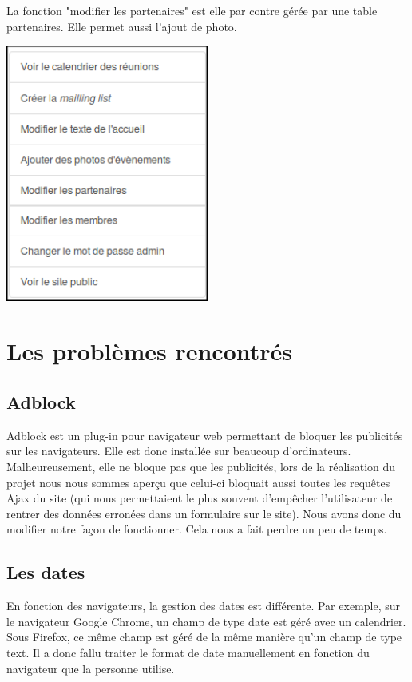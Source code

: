 \documentclass[11pt,a4paper,titlepage]{report}
\begin{document}
La fonction "modifier les partenaires" est elle par contre gérée par une table partenaires. 
Elle permet aussi l'ajout de photo.


\begin{center}
\includegraphics[width=0.5\textwidth]{gestion.png}~
\end{center}

\chapter{Les problèmes rencontrés}

\section{Adblock} 
Adblock est un plug-in pour navigateur web permettant de bloquer les publicités sur les navigateurs. Elle est donc installée sur beaucoup d'ordinateurs. 
Malheureusement, elle ne bloque pas que les publicités, lors de la réalisation du projet nous nous sommes aperçu que celui-ci bloquait aussi toutes les requêtes Ajax du site (qui nous permettaient le plus souvent d’empêcher l'utilisateur de rentrer des données erronées dans un formulaire sur le site).
Nous avons donc du modifier notre façon de fonctionner. Cela nous a fait perdre un peu de temps.

\section{Les dates}
En fonction des navigateurs, la gestion des dates est différente. Par exemple, sur le navigateur Google Chrome, un champ de type date est géré avec un calendrier. Sous Firefox, ce même champ est géré de la même manière qu'un champ de type text. Il a donc fallu traiter le format de date manuellement en fonction du navigateur que la personne utilise.
\end{document}
